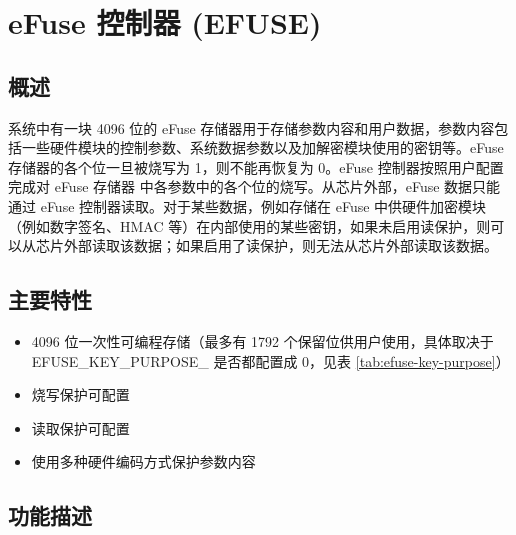 \documentclass[main\_\_CN.tex]{subfiles}
\begin{document}

\ifglobal
\else
    {\let\clearpage\relax \listoftodos}
    {\let\clearpage\relax \listofdonetodos}
    \tableofcontents
\fi



\chapter{eFuse 控制器 (EFUSE)}
\label{mod:efuse}
\hypertarget{efuse}{}

\section{概述}

\chipname{} 系统中有一块 4096 位的 eFuse 存储器用于存储参数内容和用户数据，参数内容包括一些硬件模块的控制参数、系统数据参数以及加解密模块使用的密钥等。eFuse 存储器的各个位一旦被烧写为 1，则不能再恢复为 0。eFuse 控制器按照用户配置完成对 eFuse 存储器 中各参数中的各个位的烧写。从芯片外部，eFuse 数据只能通过 eFuse 控制器读取。对于某些数据，例如存储在 eFuse 中供硬件加密模块（例如数字签名、HMAC 等）在内部使用的某些密钥，如果未启用读保护，则可以从芯片外部读取该数据；如果启用了读保护，则无法从芯片外部读取该数据。


\section{主要特性}

\begin{itemize}
    \item 4096 位一次性可编程存储（最多有 1792 个保留位供用户使用，具体取决于 EFUSE\_KEY\_PURPOSE\_ 是否都配置成 0，见表 \ref{tab:efuse-key-purpose}）
    \item 烧写保护可配置
    \item 读取保护可配置
    \item 使用多种硬件编码方式保护参数内容
\end{itemize}


\section{功能描述}
\end{document}
